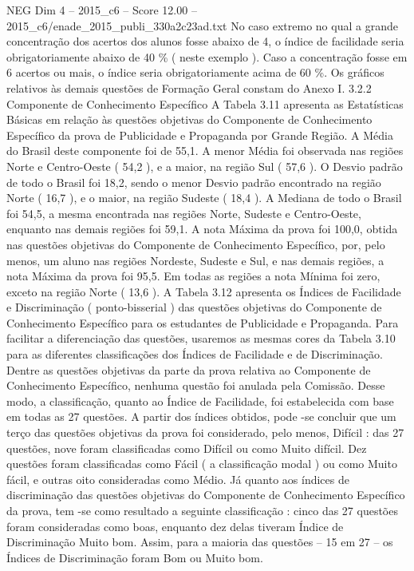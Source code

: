 \begin{textsample}{NEG Dim 4 – 2015\_c6 – Score 12.00 – 2015\_c6/enade\_2015\_publi\_330a2c23ad.txt}
No caso extremo no qual a grande concentração dos acertos dos alunos fosse abaixo de 4, o índice de facilidade seria obrigatoriamente abaixo de 40 \% ( neste exemplo ).
Caso a concentração fosse em 6 acertos ou mais, o índice seria obrigatoriamente acima de 60 \%.
Os gráficos relativos às demais questões de Formação Geral constam do Anexo I. 3.2.2 Componente de Conhecimento Específico A Tabela 3.11 apresenta as Estatísticas Básicas em relação às questões objetivas do Componente de Conhecimento Específico da prova de Publicidade e Propaganda por Grande Região.
A Média do Brasil deste componente foi de 55,1.
A menor Média foi observada nas regiões Norte e Centro-Oeste ( 54,2 ), e a maior, na região Sul ( 57,6 ).
O Desvio padrão de todo o Brasil foi 18,2, sendo o menor Desvio padrão encontrado na região Norte ( 16,7 ), e o maior, na região Sudeste ( 18,4 ).
A Mediana de todo o Brasil foi 54,5, a mesma encontrada nas regiões Norte, Sudeste e Centro-Oeste, enquanto nas demais regiões foi 59,1.
A nota Máxima da prova foi 100,0, obtida nas questões objetivas do Componente de Conhecimento Específico, por, pelo menos, um aluno nas regiões Nordeste, Sudeste e Sul, e nas demais regiões, a nota Máxima da prova foi 95,5.
Em todas as regiões a nota Mínima foi zero, exceto na região Norte ( 13,6 ).
A Tabela 3.12 apresenta os Índices de Facilidade e Discriminação ( ponto-bisserial ) das questões objetivas do Componente de Conhecimento Específico para os estudantes de Publicidade e Propaganda.
Para facilitar a diferenciação das questões, usaremos as mesmas cores da Tabela 3.10 para as diferentes classificações dos Índices de Facilidade e de Discriminação.
Dentre as questões objetivas da parte da prova relativa ao Componente de Conhecimento Específico, nenhuma questão foi anulada pela Comissão.
Desse modo, a classificação, quanto ao Índice de Facilidade, foi estabelecida com base em todas as 27 questões.
A partir dos índices obtidos, pode -se concluir que um terço das questões objetivas da prova foi considerado, pelo menos, Difícil : das 27 questões, nove foram classificadas como Difícil ou como Muito difícil.
Dez questões foram classificadas como Fácil ( a classificação modal ) ou como Muito fácil, e outras oito consideradas como Médio.
Já quanto aos índices de discriminação das questões objetivas do Componente de Conhecimento Específico da prova, tem -se como resultado a seguinte classificação : cinco das 27 questões foram consideradas como boas, enquanto dez delas tiveram Índice de Discriminação Muito bom.
Assim, para a maioria das questões – 15 em 27 – os Índices de Discriminação foram Bom ou Muito bom.

\end{textsample}
